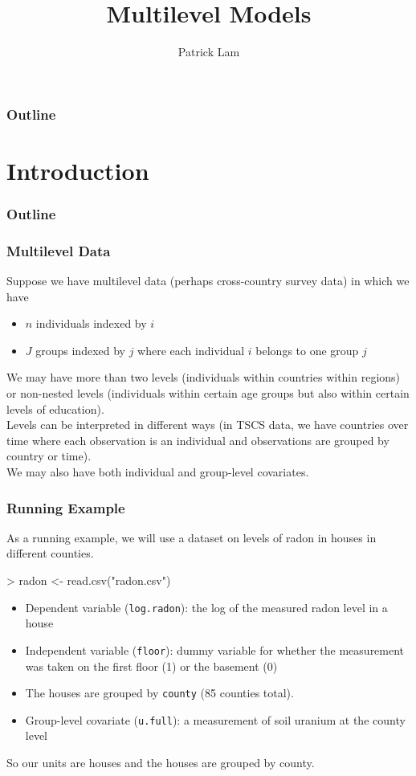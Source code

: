 \documentclass[handout]{beamer}
\author{Patrick Lam}
\title{Multilevel Models}
\date{}
\begin{document}
\newcommand{\red}{\textcolor{red}}
\newcommand{\blue}{\textcolor{blue}}
\newcommand{\purple}{\textcolor{purple}}

\frame{\titlepage}

\begin{frame}
\frametitle{Outline}
\tableofcontents
\end{frame}

\section{Introduction}

\begin{frame}
\frametitle{Outline}
\tableofcontents[currentsection]
\end{frame}

\begin{frame}
\frametitle{Multilevel Data}
\pause
Suppose we have multilevel data (perhaps cross-country survey data) in
which we have
\pause
\begin{itemize}
\item $n$ individuals indexed by $i$
\pause
\item $J$ groups indexed by $j$ where each individual $i$ belongs to
one group $j$
\end{itemize}
\pause
\bigskip
We may have more than two levels (individuals
within countries within regions) \pause or non-nested levels
(individuals within certain age groups but also within certain levels
of education).\\
\pause
\bigskip
Levels can be interpreted in different ways \pause (in TSCS data, we have
countries over time where each observation is an individual and observations are grouped by country or time).\\
\pause
\bigskip
We may also have both individual and group-level covariates.
\end{frame}

\begin{frame}[fragile]
\frametitle{Running Example}
\pause
As a running example, we will use a dataset on levels of
radon in houses in different counties.
\pause
\tiny
\medskip
\begin{Schunk}
\begin{Sinput}
> radon <- read.csv("radon.csv")
\end{Sinput}
\end{Schunk}
\normalsize 
\pause
\begin{itemize}
\item Dependent variable ({\tt log.radon}): the log of the measured
radon level in a house
\pause
\item Independent variable ({\tt floor}): dummy variable for whether
the measurement was taken on the first floor (1) or the basement (0)
\pause
\item The houses are grouped by {\tt county} (85 counties total).
\pause
\item Group-level covariate ({\tt u.full}): a measurement of soil
uranium at the county level
\end{itemize}
\pause
\bigskip
So our units are houses and the houses are grouped by county.
\end{frame}
\end{document}
